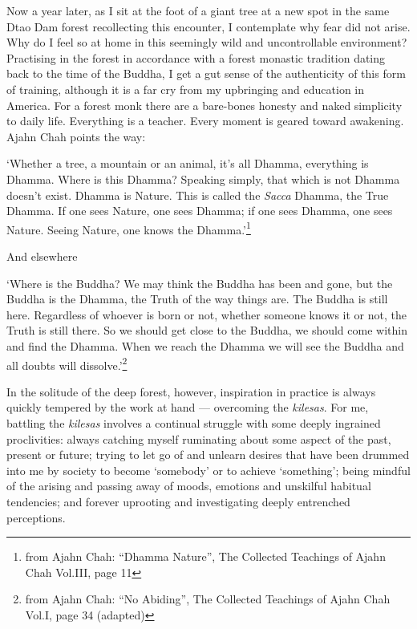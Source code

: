 Now a year later, as I sit at the foot of a giant tree at a new spot in
the same Dtao Dam forest recollecting this encounter, I contemplate why
fear did not arise. Why do I feel so at home in this seemingly wild and
uncontrollable environment? Practising in the forest in accordance with
a forest monastic tradition dating back to the time of the Buddha, I get
a gut sense of the authenticity of this form of training, although it is
a far cry from my upbringing and education in America. For a forest monk
there are a bare-bones honesty and naked simplicity to daily life.
Everything is a teacher. Every moment is geared toward awakening. Ajahn
Chah points the way:

`Whether a tree, a mountain or an animal, it's all Dhamma, everything is
Dhamma. Where is this Dhamma? Speaking simply, that which is not Dhamma
doesn't exist. Dhamma is Nature. This is called the \emph{Sacca} Dhamma,
the True Dhamma. If one sees Nature, one sees Dhamma; if one sees
Dhamma, one sees Nature. Seeing Nature, one knows the Dhamma.'\footnote{from
  Ajahn Chah: ``Dhamma Nature'', The Collected Teachings of Ajahn Chah
  Vol.III, page 11}

And elsewhere

`Where is the Buddha? We may think the Buddha has been and gone, but the
Buddha is the Dhamma, the Truth of the way things are. The Buddha is
still here. Regardless of whoever is born or not, whether someone knows
it or not, the Truth is still there. So we should get close to the
Buddha, we should come within and find the Dhamma. When we reach the
Dhamma we will see the Buddha and all doubts will dissolve.'\footnote{from
  Ajahn Chah: ``No Abiding'', The Collected Teachings of Ajahn Chah
  Vol.I, page 34 (adapted)}

In the solitude of the deep forest, however, inspiration in practice is
always quickly tempered by the work at hand --- overcoming the
\emph{kilesas}. For me, battling the \emph{kilesas} involves a continual
struggle with some deeply ingrained proclivities: always catching myself
ruminating about some aspect of the past, present or future; trying to
let go of and unlearn desires that have been drummed into me by society
to become `somebody' or to achieve `something'; being mindful of the
arising and passing away of moods, emotions and unskilful habitual
tendencies; and forever uprooting and investigating deeply entrenched
perceptions.

